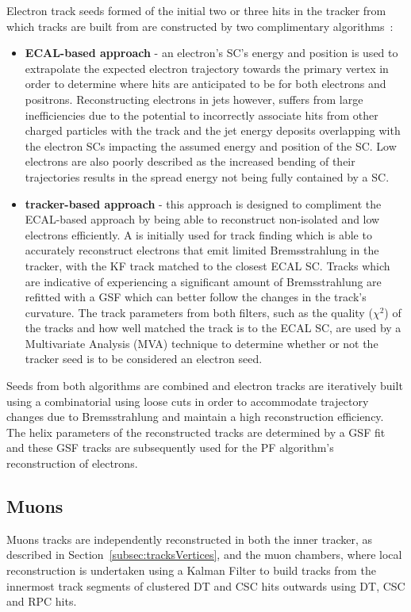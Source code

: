 Electron track seeds formed of the initial two or three hits in the tracker from which tracks are built from are constructed by two complimentary algorithms~\cite{Khachatryan:2015hwa}:
\begin{itemize}
\item \textbf{ECAL-based approach} - an electron's SC's energy and position is used to extrapolate the expected electron trajectory towards the primary vertex in order to determine where hits are anticipated to be for both electrons and positrons.
Reconstructing electrons in jets however, suffers from large inefficiencies due to the potential to incorrectly associate hits from other charged particles with the track and the jet energy deposits  overlapping with the electron SCs impacting the assumed energy and position of the SC.
Low \pT electrons are also poorly described as the increased bending of their trajectories results in the spread energy not being fully contained by a SC.
\item \textbf{tracker-based approach} - this approach is designed to compliment the ECAL-based approach by being able to reconstruct non-isolated and low \pT electrons efficiently.
A \KF is initially used for track finding which is able to accurately reconstruct electrons that emit limited Bremsstrahlung in the tracker, with the KF track matched to the closest ECAL SC.
Tracks which are indicative of experiencing a significant amount of Bremsstrahlung are refitted with a GSF which can better follow the changes in the track's curvature.
The track parameters from both filters, such as the quality ($\chi^{2}$) of the tracks and how well matched the track is to the ECAL SC, are used by a Multivariate Analysis (MVA) technique to determine whether or not the tracker seed is to be considered an electron seed.
\end{itemize}

Seeds from both algorithms are combined and electron tracks are iteratively built using a  combinatorial \KF using loose cuts in order to accommodate trajectory changes due to Bremsstrahlung and maintain a high reconstruction efficiency.
The helix parameters of the reconstructed tracks are determined by a GSF fit and these GSF tracks are subsequently used for the PF algorithm's reconstruction of electrons.

\subsection{Muons}\label{subsec:muons}
Muons tracks are independently reconstructed in both the inner tracker, as described in Section~\ref{subsec:tracksVertices}, and the muon chambers, where local reconstruction is undertaken using a Kalman Filter to build tracks from the innermost track segments of clustered DT and CSC hits outwards using DT, CSC and RPC hits.


